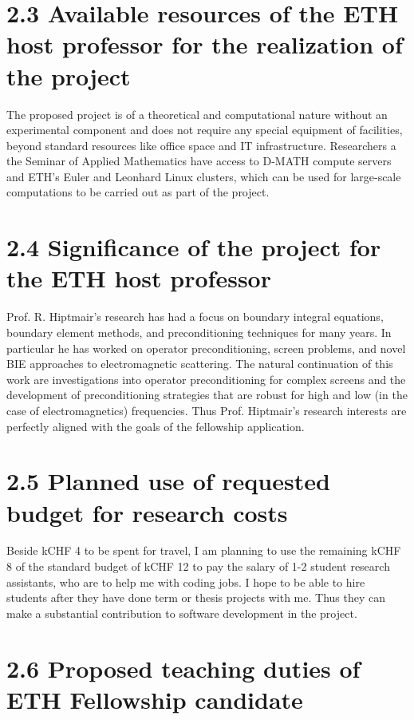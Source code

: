 \documentclass[]{report}
\begin{document}
\section*{2.3 Available resources of the ETH host professor for the realization of the project}

The proposed project is of a theoretical and computational nature without an experimental component and does not require any special equipment of facilities, beyond standard resources like office space and IT infrastructure. Researchers a the Seminar of Applied Mathematics have access to D-MATH compute servers and ETH's Euler and Leonhard Linux clusters, which can be used for large-scale computations to be carried out as part of the project.

\section*{2.4 Significance of the project for the ETH host professor} 

Prof. R. Hiptmair's research has had a focus on boundary integral equations, boundary element methods, and preconditioning techniques for many years. In particular he has worked on operator preconditioning, screen problems, and novel BIE approaches to electromagnetic scattering. The natural continuation of this work are investigations into operator preconditioning for complex screens and the development of preconditioning strategies that are robust for high and low (in the case of electromagnetics) frequencies. Thus Prof. Hiptmair's research interests are perfectly aligned with the goals of the fellowship application.


\section*{2.5 Planned use of requested budget for research costs }

Beside kCHF 4 to be spent for travel, I am planning to use the remaining kCHF 8 of the standard budget of kCHF 12 to pay the salary of 1-2 student research assistants, who are to help me with coding jobs. I hope to be able to hire students after they have done term or thesis projects with me. Thus they can make a substantial contribution to software development in the project.

\section*{2.6 Proposed teaching duties of ETH Fellowship candidate}
\end{document}
